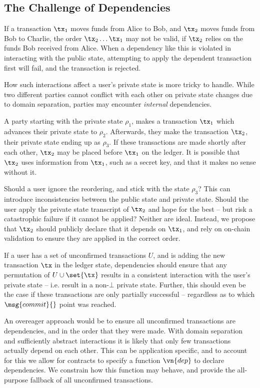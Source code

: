 \subsection{The Challenge of Dependencies}
\label{sec:deps}

If a transaction $\tx_1$ moves funds from Alice to Bob, and $\tx_2$ moves funds
from Bob to Charlie, the order $\tx_2\ldots\tx_1$ may not be valid, if $\tx_2$
relies on the funds Bob received from Alice. When a dependency like this is
violated in interacting with the public state, attempting to apply the dependent
transaction first will fail, and the transaction is rejected.

How such interactions affect a user's private state is more tricky to handle.
While two different parties cannot conflict with each other on private state
changes due to domain separation, parties may encounter \emph{internal}
dependencies.

A party starting with the private state $\rho_1$, makes a transaction $\tx_1$
which advances their private state to $\rho_2$. Afterwards, they make the
transaction $\tx_2$, their private state ending up as $\rho_3$. If these
transactions are made shortly after each other, $\tx_2$ may be placed before
$\tx_1$ on the ledger. It is possible that $\tx_2$ uses information from
$\tx_1$, such as a secret key, and that it makes no sense without it.

Should a user ignore the reordering, and stick with the state $\rho_3$? This
can introduce inconsistencies between the public state and private state. Should
the user apply the private state transcript of $\tx_2$ and hope for the best --
but risk a catastrophic failure if it cannot be applied? Neither are ideal.
Instead, we propose that $\tx_2$ should publicly declare that it depends on
$\tx_1$, and rely on on-chain validation to ensure they are applied in the
correct order.

If a user has a set of unconfirmed transactions $U$, and is adding the new
transaction $\tx$ in the ledger state, dependencies should ensure
that any permutation of $U \cup \set{\tx}$ results in a consistent interaction
with the user's private state -- i.e. result in a non-$\bot$ private state.
Further, this should even be the case if these transactions are only partially
  successful -- regardless as to which $\msg{commit}{}$ point was reached.

An overeager approach would be to ensure all unconfirmed transactions are
dependencies, and in the order that they were made. With domain separation and
sufficiently abstract interactions it is likely that only few transactions
actually depend on each other. This can be application specific, and to account
for this we allow for contracts to specify a function $\vn{dep}$ to declare
dependencies. We constrain how this function may behave, and provide the
all-purpose fallback of all unconfirmed transactions.

